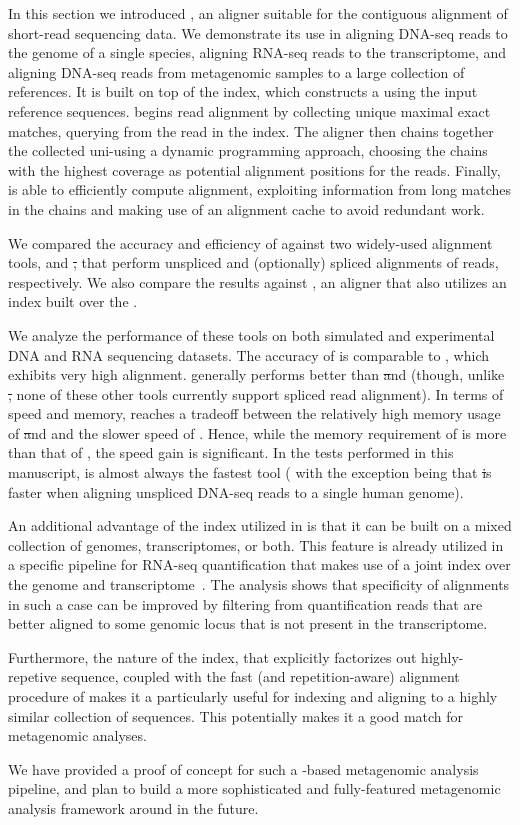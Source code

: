 In this section we introduced \puffaligner, an aligner suitable for the
contiguous alignment of short-read sequencing data. We demonstrate its
use in aligning DNA-seq reads to the genome of a single species, aligning RNA-seq reads
to the transcriptome, and aligning DNA-seq reads from metagenomic samples to a 
large collection of references. It is built on top of the \pufferfish index, which constructs
a \ccdbg using the input reference sequences. \puffaligner begins read
alignment by collecting unique maximal exact matches, querying \kmers from the
read in the \pufferfish index. The aligner then chains together the collected
uni-\mems using a dynamic programming approach, choosing the chains with the
highest coverage as potential alignment positions for the reads. Finally,
\puffaligner is able to efficiently compute alignment,
exploiting information from long matches in the chains and making use of an 
alignment cache to avoid redundant work.

We compared the accuracy and efficiency of \puffaligner against two
widely-used alignment tools, \bt and \st, that perform unspliced and
(optionally) spliced alignments of reads, respectively. We also compare
the results against \debga, an aligner that also utilizes an index built
over the \dbg.

We analyze the performance of these tools on both simulated and
experimental DNA and RNA sequencing datasets. The accuracy of
\puffaligner is comparable to \bt, which exhibits very high  
alignment. \puffaligner generally performs better than \st and \debga
(though, unlike \st, none of these other tools currently support spliced read
alignment). In terms of speed and memory, \puffaligner reaches a tradeoff
between the relatively high memory usage of \st and \debga and the slower
speed of \bt. Hence, while the memory requirement of \puffaligner is more
than that of \bt, the speed gain is significant.  In the tests performed 
in this manuscript, \puffaligner is almost always the fastest tool (
with the exception being that \st is faster when aligning unspliced 
DNA-seq reads to a single human genome).

An additional advantage of the \pufferfish index utilized in \puffaligner
is that it can be built on a mixed collection of genomes, transcriptomes,
or both. This feature is already utilized in a specific pipeline for
RNA-seq quantification that makes use of a joint index over the genome 
and transcriptome~\citep{srivastava2019alignment}. The analysis shows 
that specificity of alignments in such a case can be improved by filtering 
from quantification reads that are better aligned to some genomic locus 
that is not present in the transcriptome.

Furthermore, the nature of the \pufferfish index, that explicitly
factorizes out highly-repetive sequence, coupled with the fast (and
repetition-aware) alignment procedure of \puffaligner makes it a
particularly useful for indexing and aligning to a highly similar
collection of sequences. This potentially makes it a good match 
for metagenomic analyses.

We have provided a proof of concept for such a \puffaligner-based
metagenomic analysis pipeline, and plan to build a more sophisticated 
and fully-featured metagenomic analysis framework around \puffaligner 
in the future. 